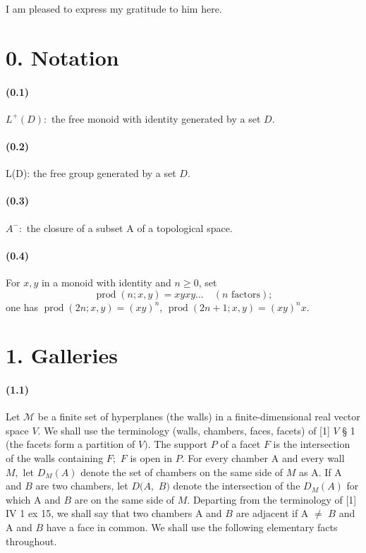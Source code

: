 \documentclass[10pt,a4paper]{article}
\begin{document}
I am pleased to express my gratitude to him here.\par

\section*{0. Notation}

\paragraph{(0.1)} \ensuremath{L^{+}(D):} the free monoid with identity generated by a set \ensuremath{D.}

\paragraph{(0.2)} L(D): the free group generated by a set \ensuremath{D.}

\paragraph{(0.3)} \ensuremath{A^{-}:} the closure of a subset A of a topological space.

\paragraph{(0.4)} For $x,y$ in a monoid with identity and $n\geq 0$, set
\[\operatorname{prod}(n;x,y)=xyxy\ldots\quad(n\text{ factors});\]
one has $\operatorname{prod}(2n;x,y)=(xy)^n$,
$\operatorname{prod}(2n+1;x,y)=(xy)^n x$.

\section*{1. Galleries}

\paragraph{(1.1)} Let \ensuremath{\mathcal{M}} be a finite set of hyperplanes (the walls) in a finite-dimensional real vector space \ensuremath{V.} We shall use the terminology (walls, chambers, faces, facets) of [1] \ensuremath{V} \S{} 1 (the facets form a partition of \ensuremath{V).} The support \ensuremath{P} of a facet \ensuremath{F} is the intersection of the walls containing \ensuremath{F;} \ensuremath{F} is open in \ensuremath{P.} For every chamber A and every wall \ensuremath{M,} let \ensuremath{D_M(A)} denote the set of chambers on the same side of \ensuremath{M} as A. If A and \ensuremath{B} are two chambers, let \ensuremath{D(A,} \ensuremath{B)} denote the intersection of the \ensuremath{D_M(A)} for which A and \ensuremath{B} are on the same side of \ensuremath{M.} Departing from the terminology of [1] IV 1 ex 15, we shall say that two chambers A and \ensuremath{B} are adjacent if A \ensuremath{\ne{}} \ensuremath{B} and A and \ensuremath{B} have a face in common. We shall use the following elementary facts throughout.
\end{document}
